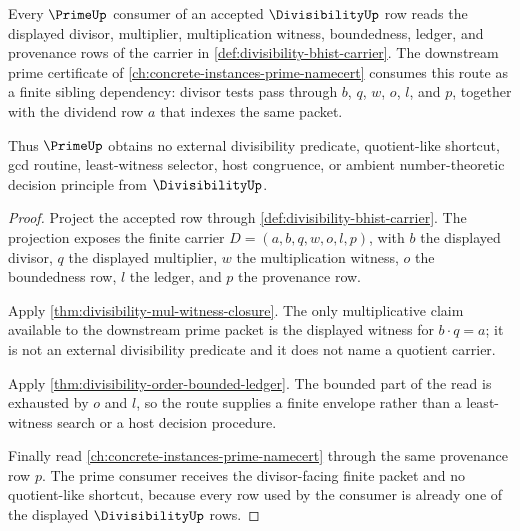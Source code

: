 \begin{theorem}
\label{thm:divisibility-prime-sibling-route}
Every $\PrimeUp$ consumer of an accepted $\DivisibilityUp$ row reads the
displayed divisor, multiplier, multiplication witness, boundedness, ledger,
and provenance rows of the carrier in \autoref{def:divisibility-bhist-carrier}.
The downstream prime certificate of
\autoref{ch:concrete-instances-prime-namecert} consumes this route as a finite
sibling dependency: divisor tests pass through $b$, $q$, $w$, $o$, $l$, and
$p$, together with the dividend row $a$ that indexes the same packet.

Thus $\PrimeUp$ obtains no external divisibility predicate, quotient-like
shortcut, gcd routine, least-witness selector, host congruence, or ambient
number-theoretic decision principle from $\DivisibilityUp$.
\end{theorem}
\begin{proof}
Project the accepted row through \autoref{def:divisibility-bhist-carrier}.
The projection exposes the finite carrier
$D=(a,b,q,w,o,l,p)$, with $b$ the displayed divisor, $q$ the displayed
multiplier, $w$ the multiplication witness, $o$ the boundedness row, $l$ the
ledger, and $p$ the provenance row.

Apply \autoref{thm:divisibility-mul-witness-closure}. The only multiplicative
claim available to the downstream prime packet is the displayed witness for
$b\cdot q=a$; it is not an external divisibility predicate and it does not name
a quotient carrier.

Apply \autoref{thm:divisibility-order-bounded-ledger}. The bounded part of the
read is exhausted by $o$ and $l$, so the route supplies a finite envelope rather
than a least-witness search or a host decision procedure.

Finally read \autoref{ch:concrete-instances-prime-namecert} through the same
provenance row $p$. The prime consumer receives the divisor-facing finite
packet and no quotient-like shortcut, because every row used by the consumer is
already one of the displayed $\DivisibilityUp$ rows.
\end{proof}

